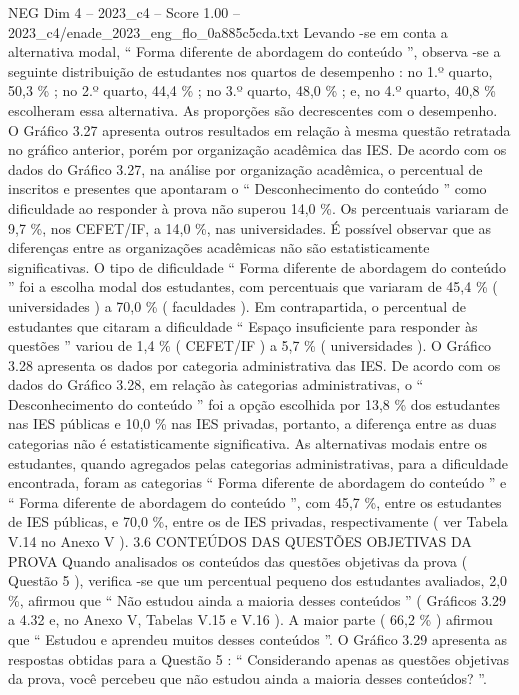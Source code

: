 \begin{textsample}{NEG Dim 4 – 2023\_c4 – Score 1.00 – 2023\_c4/enade\_2023\_eng\_flo\_0a885c5cda.txt}
Levando -se em conta a alternativa modal, “ Forma diferente de abordagem do conteúdo ”, observa -se a seguinte distribuição de estudantes nos quartos de desempenho : no 1.º quarto, 50,3 \% ; no 2.º quarto, 44,4 \% ; no 3.º quarto, 48,0 \% ; e, no 4.º quarto, 40,8 \% escolheram essa alternativa.
As proporções são decrescentes com o desempenho.
O Gráfico 3.27 apresenta outros resultados em relação à mesma questão retratada no gráfico anterior, porém por organização acadêmica das IES.
De acordo com os dados do Gráfico 3.27, na análise por organização acadêmica, o percentual de inscritos e presentes que apontaram o “ Desconhecimento do conteúdo ” como dificuldade ao responder à prova não superou 14,0 \%.
Os percentuais variaram de 9,7 \%, nos CEFET/IF, a 14,0 \%, nas universidades.
É possível observar que as diferenças entre as organizações acadêmicas não são estatisticamente significativas.
O tipo de dificuldade “ Forma diferente de abordagem do conteúdo ” foi a escolha modal dos estudantes, com percentuais que variaram de 45,4 \% ( universidades ) a 70,0 \% ( faculdades ).
Em contrapartida, o percentual de estudantes que citaram a dificuldade “ Espaço insuficiente para responder às questões ” variou de 1,4 \% ( CEFET/IF ) a 5,7 \% ( universidades ).
O Gráfico 3.28 apresenta os dados por categoria administrativa das IES.
De acordo com os dados do Gráfico 3.28, em relação às categorias administrativas, o “ Desconhecimento do conteúdo ” foi a opção escolhida por 13,8 \% dos estudantes nas IES públicas e 10,0 \% nas IES privadas, portanto, a diferença entre as duas categorias não é estatisticamente significativa.
As alternativas modais entre os estudantes, quando agregados pelas categorias administrativas, para a dificuldade encontrada, foram as categorias “ Forma diferente de abordagem do conteúdo ” e “ Forma diferente de abordagem do conteúdo ”, com 45,7 \%, entre os estudantes de IES públicas, e 70,0 \%, entre os de IES privadas, respectivamente ( ver Tabela V.14 no Anexo V ). 3.6 CONTEÚDOS DAS QUESTÕES OBJETIVAS DA PROVA Quando analisados os conteúdos das questões objetivas da prova ( Questão 5 ), verifica -se que um percentual pequeno dos estudantes avaliados, 2,0 \%, afirmou que “ Não estudou ainda a maioria desses conteúdos ” ( Gráficos 3.29 a 4.32 e, no Anexo V, Tabelas V.15 e V.16 ).
A maior parte ( 66,2 \% ) afirmou que “ Estudou e aprendeu muitos desses conteúdos ”.
O Gráfico 3.29 apresenta as respostas obtidas para a Questão 5 : “ Considerando apenas as questões objetivas da prova, você percebeu que não estudou ainda a maioria desses conteúdos? ”.

\end{textsample}

